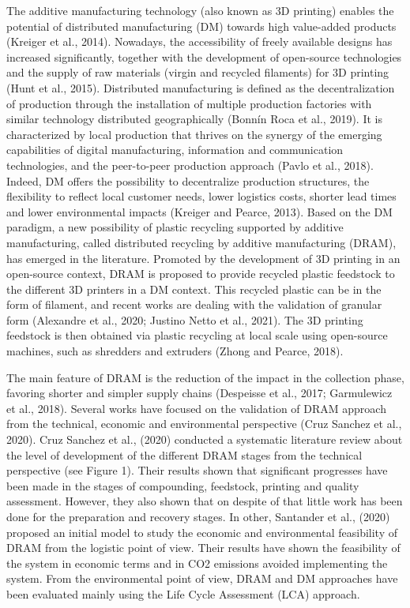 \documentclass[]{elsarticle} %
\begin{document}
The additive manufacturing technology (also known as 3D printing) enables the potential of distributed manufacturing (DM) towards high value-added products (Kreiger et al., 2014).
Nowadays, the accessibility of freely available designs has increased significantly, together with the development of open-source technologies and the supply of raw materials (virgin and recycled filaments) for 3D printing (Hunt et al., 2015).
Distributed manufacturing is defined as the decentralization of production through the installation of multiple production factories with similar technology distributed geographically (Bonnín Roca et al., 2019).
It is characterized by local production that thrives on the synergy of the emerging capabilities of digital manufacturing, information and communication technologies, and the peer-to-peer production approach (Pavlo et al., 2018).
Indeed, DM offers the possibility to decentralize production structures, the flexibility to reflect local customer needs, lower logistics costs, shorter lead times and lower environmental impacts (Kreiger and Pearce, 2013).
Based on the DM paradigm, a new possibility of plastic recycling supported by additive manufacturing, called distributed recycling by additive manufacturing (DRAM), has emerged in the literature.
Promoted by the development of 3D printing in an open-source context, DRAM is proposed to provide recycled plastic feedstock to the different 3D printers in a DM context.
This recycled plastic can be in the form of filament, and recent works are dealing with the validation of granular form (Alexandre et al., 2020; Justino Netto et al., 2021). The 3D printing feedstock is then obtained via plastic recycling at local scale using open-source machines, such as shredders and extruders (Zhong and Pearce, 2018).

The main feature of DRAM is the reduction of the impact in the collection phase, favoring shorter and simpler supply chains (Despeisse et al., 2017; Garmulewicz et al., 2018).
Several works have focused on the validation of DRAM approach from the technical, economic and environmental perspective (Cruz Sanchez et al., 2020).
Cruz Sanchez et al., (2020) conducted a systematic literature review about the level of development of the different DRAM stages from the technical perspective (see Figure 1).
Their results shown that significant progresses have been made in the stages of compounding, feedstock, printing and quality assessment.
However, they also shown that on despite of that little work has been done for the preparation and recovery stages.
In other, Santander et al., (2020) proposed an initial model to study the economic and environmental feasibility of DRAM from the logistic point of view. Their results have shown the feasibility of the system in economic terms and in CO2 emissions avoided implementing the system.
From the environmental point of view, DRAM and DM approaches have been evaluated mainly using the Life Cycle Assessment (LCA) approach.
\end{document}
